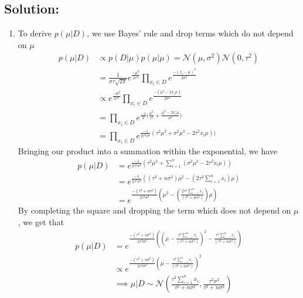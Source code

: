 \documentclass[submit]{harvardml}
\begin{document}
\subsection*{Solution:}
\begin{enumerate}
    \item To derive $p(\mu | D)$, we use Bayes' rule and drop terms which do not depend on $\mu$
    \begin{align}
        p(\mu | D) &\propto p(D| \mu) p(\mu | \mu) = \mathcal{N}(\mu,  \sigma^2) \mathcal{N}(0, \tau^2) \\
        &= \frac{1}{\sigma\tau \sqrt{2 \pi}} e^{\frac{-\mu^2}{2\tau^2}} \prod_{x_i \in D} e^\frac{-(x_i - \mu)^2}{2\sigma^2} \\
        & \propto e^{\frac{-\mu^2}{2\tau^2}} \prod_{x_i \in D} e^\frac{-(\mu^2 - 2x_i \mu)}{2\sigma^2} \\
        &= \prod_{x_i \in D} e^{\frac{-1}{2}{(\frac{\mu^2}{\tau^2} + \frac{\mu^2 - 2x_i \mu}{\sigma^2}})} \\
        &= \prod_{x_i \in D} e^{\frac{-1}{2\tau^2 \sigma^2}(\tau^2 \mu^2  + \sigma^2 \mu^2 - 2\tau^2 x_i\mu))}
    \end{align}
    Bringing our product into a summation within the exponential, we have
    \begin{align}
        p(\mu | D) &= e^{\frac{-1}{2\tau^2 \sigma^2}(\tau^2 \mu^2  + \sum_{i=1}^n(\sigma^2 \mu^2 - 2\tau^2 x_i\mu))} \\
        &= e^{\frac{-1}{2\tau^2 \sigma^2}((\tau^2 + n \sigma^2)\mu^2 - (2\tau^2 \sum_{i=1}^n x_i)\mu)} \\
        &= e^{\frac{-(\tau^2 + n \sigma^2)}{2\tau^2 \sigma^2}(\mu^2 - (\frac{2\tau^2 \sum_{i=1}^n x_i}{(\tau^2 + n \sigma^2)})\mu)}
    \end{align}
    By completing the square and dropping the term which does not depend on $\mu$, we get that 
    \begin{align}
        p(\mu | D) &= e^{\frac{-(\tau^2 + n \sigma^2)}{2\tau^2 \sigma^2}((\mu - \frac{\tau^2 \sum_{i=1}^n x_i}{(\tau^2 + n \sigma^2)})^2 - \frac{\tau^2 \sum_{i=1}^n x_i}{(\tau^2 + n \sigma^2)})} \\
        &\propto e^{\frac{-(\tau^2 + n \sigma^2)}{2\tau^2 \sigma^2}(\mu - \frac{\tau^2 \sum_{i=1}^n x_i}{(\tau^2 + n \sigma^2)})^2} \\
        & \implies \mu | D \sim \mathcal{N}(\frac{\tau^2 \sum_{i=1}^n x_i}{\tau^2 + n \sigma^2}, \frac{\tau^2 \sigma^2}{\tau^2 + n\sigma^2})
    \end{align}
    

\end{enumerate}
\end{document}
